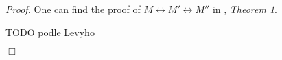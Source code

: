 \documentclass[12pt,a4paper]{article}
\newenvironment{proof}
{\noindent \textit{Proof.}}
{\hspace*{\fill} $\Box$}
\renewcommand{\iff}{\leftrightarrow}
\newcommand{\then}{\rightarrow}
\begin{document}
\begin{proof}
One can find the proof of $M \iff M' \iff M''$ in \cite{Levy60a}, \emph{Theorem 1}. %

TODO podle Levyho




\end{proof}
\end{document}
